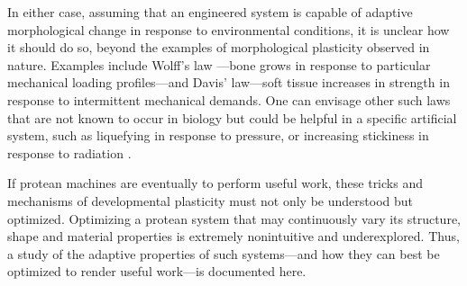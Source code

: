


In either case, assuming that an engineered system is capable of adaptive morphological change in response to environmental conditions, it is unclear how it should do so, beyond the examples of morphological plasticity observed in nature. 
Examples include Wolff's law \cite{ruff2006s}---bone grows in response to particular mechanical loading profiles---and Davis' law---soft tissue increases in strength in response to intermittent mechanical demands.
One can envisage other such laws that are not known to occur in biology but could be helpful in a specific artificial system, 
such as 
liquefying
in response to pressure, or
increasing stickiness in response to radiation \cite{nasa1970radiation}.


If protean machines are eventually to perform useful work, 
these tricks and mechanisms
of developmental plasticity 
must not only be understood but optimized.
Optimizing a protean system that may 
continuously vary its structure, shape and material properties
is extremely nonintuitive and underexplored.
Thus, a study of the adaptive properties of such systems---and how they can best be optimized to render useful work---is documented here. 




